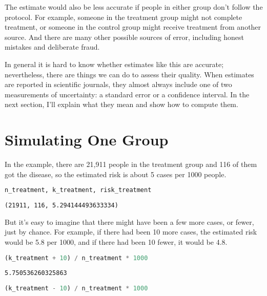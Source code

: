 The estimate would also be less accurate if people in either group don't
follow the protocol. For example, someone in the treatment group might
not complete treatment, or someone in the control group might receive
treatment from another source. And there are many other possible sources
of error, including honest mistakes and deliberate fraud.

In general it is hard to know whether estimates like this are accurate;
nevertheless, there are things we can do to assess their quality. When
estimates are reported in scientific journals, they almost always
include one of two measurements of uncertainty: a standard error or a
confidence interval. In the next section, I'll explain what they mean
and show how to compute them.

\section{Simulating One Group}\label{simulating-one-group}

In the example, there are 21,911 people in the treatment group and 116
of them got the disease, so the estimated risk is about 5 cases per 1000
people.

\begin{lstlisting}[language=Python,style=source]
n_treatment, k_treatment, risk_treatment
\end{lstlisting}

\begin{lstlisting}[style=output]
(21911, 116, 5.294144493633334)
\end{lstlisting}

But it's easy to imagine that there might have been a few more cases, or
fewer, just by chance. For example, if there had been 10 more cases, the
estimated risk would be 5.8 per 1000, and if there had been 10 fewer, it
would be 4.8.

\begin{lstlisting}[language=Python,style=source]
(k_treatment + 10) / n_treatment * 1000
\end{lstlisting}

\begin{lstlisting}[style=output]
5.750536260325863
\end{lstlisting}

\begin{lstlisting}[language=Python,style=source]
(k_treatment - 10) / n_treatment * 1000
\end{lstlisting}

